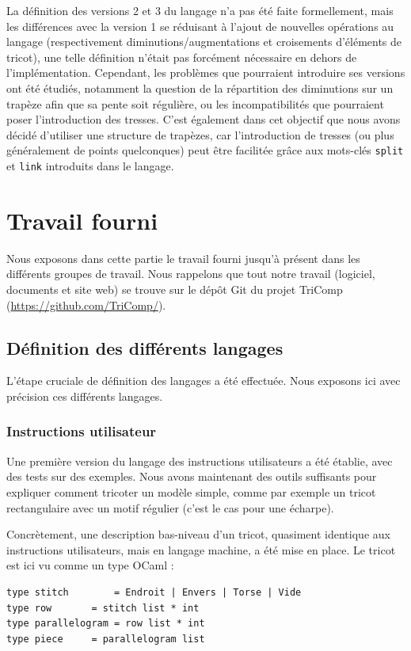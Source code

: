 \documentclass{article}
\begin{document}
La définition des versions 2 et 3 du langage n'a pas été faite formellement, mais les différences avec la version 1 se réduisant à l'ajout de 
nouvelles opérations au langage (respectivement diminutions/augmentations et croisements d'éléments de tricot), une telle définition n'était pas 
forcément nécessaire en dehors de l'implémentation. 
Cependant, les problèmes que pourraient introduire ses versions ont été étudiés, notamment la question de la répartition des diminutions sur un 
trapèze afin que sa pente soit régulière, ou les incompatibilités que pourraient poser l'introduction des tresses. C'est également dans cet objectif que nous avons décidé d'utiliser une structure de trapèzes, car l'introduction de tresses (ou plus généralement de points quelconques) peut être facilitée grâce aux mots-clés \texttt{split} et \texttt{link} introduits dans le langage.

\newpage

\section{Travail fourni}

Nous exposons dans cette partie le travail fourni jusqu'à présent dans les différents groupes de travail. Nous rappelons que tout notre travail (logiciel, documents et site web) se trouve sur le dépôt Git du projet TriComp (\url{https://github.com/TriComp/}).

\subsection{Définition des différents langages}

L'étape cruciale de définition des langages a été effectuée. Nous exposons ici avec précision ces différents langages.

\subsubsection{Instructions utilisateur}

Une première version du langage des instructions utilisateurs a été établie, avec des tests sur des exemples. Nous avons maintenant des outils
suffisants pour expliquer comment tricoter un modèle simple, comme par exemple un tricot rectangulaire avec un motif régulier (c'est le cas pour une écharpe). 

Concrètement, une description bas-niveau d'un tricot, quasiment identique aux instructions utilisateurs, mais en langage machine, a été mise en place.
Le tricot est ici vu comme un type OCaml :
\begin{lstlisting}
type stitch 	   = Endroit | Envers | Torse | Vide
type row 	   = stitch list * int
type parallelogram = row list * int
type piece 	   = parallelogram list
\end{lstlisting}
\end{document}

